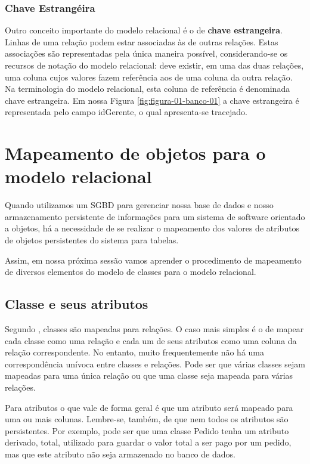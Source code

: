 \subsubsection{Chave Estrangéira}
Outro conceito importante do modelo relacional é o de \textbf{chave estrangeira}. Linhas de uma relação podem estar associadas às de outras relações. Estas associações são representadas pela única maneira possível, considerando-se os recursos de notação do modelo relacional: deve existir, em uma das duas relações, uma coluna cujos valores fazem referência aos de uma coluna da outra relação. Na terminologia do modelo relacional, esta coluna de referência é denominada chave estrangeira. Em nossa Figura \ref{fig:figura-01-banco-01} a chave estrangeira é representada pelo campo idGerente, o qual apresenta-se tracejado.

\section{Mapeamento de objetos para o modelo relacional} 

Quando utilizamos um SGBD para gerenciar nossa base de dados e nosso armazenamento persistente de informações para um sistema de software orientado a objetos, há a necessidade de se realizar o mapeamento dos valores de atributos de objetos persistentes do sistema para tabelas. 

Assim, em nossa próxima sessão vamos aprender o procedimento de mapeamento de diversos elementos do modelo de classes para o modelo relacional. 

\subsection{Classe e seus atributos}

Segundo , classes são mapeadas para relações. O caso mais simples é o de mapear cada classe como uma relação e cada um de seus atributos como uma coluna da relação correspondente. No entanto, muito frequentemente não há uma correspondência unívoca entre classes e relações. Pode ser que várias classes sejam mapeadas para uma única relação ou que uma classe seja mapeada para várias relações.

Para atributos o que vale de forma geral é que um atributo será mapeado para uma ou mais colunas. Lembre-se, também, de que nem todos os atributos são persistentes. Por exemplo, pode ser que uma classe Pedido tenha um atributo derivado, total, utilizado para guardar o valor total a ser pago por um pedido, mas que este atributo não seja armazenado no banco de dados.

